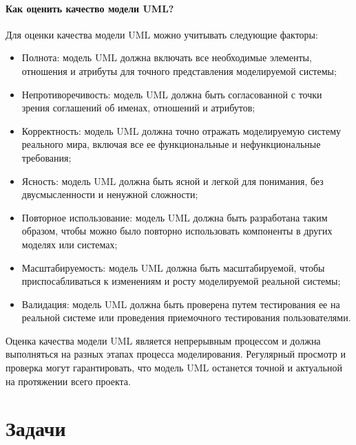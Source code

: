 \documentclass[letterpaper,10pt,russian]{sphinxmanual}
\begin{document}
\paragraph{Как оценить качество модели UML?}
\label{\detokenize{educational_materials/uml/content:id20}}
\sphinxAtStartPar
Для оценки качества модели UML можно учитывать следующие факторы:
\begin{itemize}
\item {} 
\sphinxAtStartPar
Полнота: модель UML должна включать все необходимые элементы, отношения и атрибуты для точного представления моделируемой системы;

\item {} 
\sphinxAtStartPar
Непротиворечивость: модель UML должна быть согласованной с точки зрения соглашений об именах, отношений и атрибутов;

\item {} 
\sphinxAtStartPar
Корректность: модель UML должна точно отражать моделируемую систему реального мира, включая все ее функциональные и нефункциональные требования;

\item {} 
\sphinxAtStartPar
Ясность: модель UML должна быть ясной и легкой для понимания, без двусмысленности и ненужной сложности;

\item {} 
\sphinxAtStartPar
Повторное использование: модель UML должна быть разработана таким образом, чтобы можно было повторно использовать компоненты в других моделях или системах;

\item {} 
\sphinxAtStartPar
Масштабируемость: модель UML должна быть масштабируемой, чтобы приспосабливаться к изменениям и росту моделируемой реальной системы;

\item {} 
\sphinxAtStartPar
Валидация: модель UML должна быть проверена путем тестирования ее на реальной системе или проведения приемочного тестирования пользователями.

\end{itemize}

\sphinxAtStartPar
Оценка качества модели UML является непрерывным процессом и должна выполняться на разных этапах процесса моделирования. Регулярный просмотр и проверка могут гарантировать, что модель UML останется точной и актуальной на протяжении всего проекта.

\sphinxstepscope


\section{Задачи}
\label{\detokenize{educational_materials/uml/exercises:id1}}\label{\detokenize{educational_materials/uml/exercises::doc}}
\end{document}
